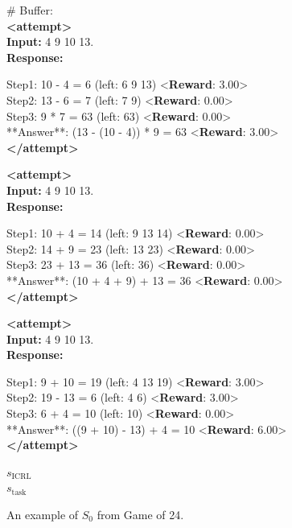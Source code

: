 \documentclass{article} %
\newcommand{\0}{\mathbf{0}}
\newcommand{\icrl}{\text{ICRL}}
\newcommand{\task}{\text{task}}
\begin{document}
\begin{figure}[H]
  \centering
  \begin{tcolorbox}[
      colback=gray!5!white, 
      colframe=black!100!black, 
      width=1\textwidth
  ]
  \small
  {\color{red} \# Buffer:} \\
  \textbf{<attempt>}\\
  \textbf{Input:} 4 9 10 13. \\
  \textbf{Response:} 

  Step1: 10 - 4 = 6 (left: 6 9 13) \quad<\textbf{Reward}: 3.00>\\ Step2: 13 - 6 = 7 (left: 7 9) \quad<\textbf{Reward}: 0.00> \\Step3: 9 * 7 = 63 (left: 63)  \quad <\textbf{Reward}: 0.00> \\**Answer**: (13 - (10 - 4)) * 9  = 63 \quad<\textbf{Reward}: 3.00> \\
  \textbf{</attempt>}\

  \vspace{0.8em}
  \textbf{<attempt>}\\
  \textbf{Input:} 4 9 10 13. \\
  \textbf{Response:} 

  Step1: 10 + 4 = 14 (left: 9 13 14)
  \quad<\textbf{Reward}: 0.00> \\ Step2: 14 + 9 = 23 (left: 13 23) \quad<\textbf{Reward}: 0.00> \\Step3: 23 + 13 = 36 (left: 36)   \quad <\textbf{Reward}: 0.00> \\**Answer**: (10 + 4 + 9) + 13 = 36 \quad<\textbf{Reward}: 0.00> \\
  \textbf{</attempt>}\

  \vspace{0.8em}
  \textbf{<attempt>}\\
  \textbf{Input:} 4 9 10 13. \\
  \textbf{Response:} 

  Step1: 9 + 10 = 19 (left: 4 13 19) \quad<\textbf{Reward}: 3.00>\\ Step2: 19 - 13 = 6 (left: 4 6)  \quad<\textbf{Reward}: 3.00> \\Step3: 6 + 4 = 10 (left: 10)   \quad <\textbf{Reward}: 0.00> \\**Answer**: ((9 + 10) - 13) + 4 = 10 \quad<\textbf{Reward}: 6.00> \\
  \textbf{</attempt>}


  \textbf{\color{red}$s_\icrl$} \\
  \textbf{\color{red}$s_\task$}



  \end{tcolorbox}
  \caption{An example of $S_0$ from Game of 24.}
  \label{fig:incontext_rl_setup}
\end{figure}
\end{document}
